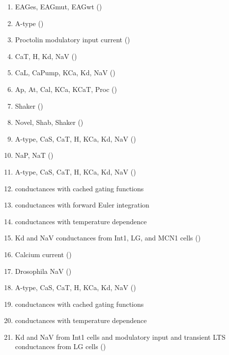 \documentclass[utf8]{frontiers_suppmat} %
\begin{document}
	\begin{enumerate}
		\item EAGes, EAGmut, EAGwt (\cite{bronkRegulationEagCa22018})
		\item A-type (\cite{brookingsAutomaticParameterEstimation2014})
		\item Proctolin modulatory input current (\cite{caplanManyParameterSets2014})
		\item CaT, H, Kd, NaV (\cite{dethierPositiveFeedbackCellular2015})
		\item CaL, CaPump, KCa, Kd, NaV (\cite{drionDopaminePacemakerNeuron2017})
		\item Ap, At, Cal, KCa, KCaT, Proc (\cite{goldmanGlobalStructureRobustness2001})
		\item Shaker (\cite{hardieNovelPotassiumChannels1991})
		\item Novel, Shab, Shaker (\cite{herasModulationVoltagedependentConductances2018})
		\item A-type, CaS, CaT, H, KCa, Kd, NaV (\cite{kisperskyIncreaseSodiumConductance2012})
		\item NaP, NaT (\cite{linActivityDependentAlternativeSplicing2012})
		\item A-type, CaS, CaT, H, KCa, Kd, NaV (\cite{liuModelNeuronActivityDependent1998})
		\item \cite{liuModelNeuronActivityDependent1998} conductances with cached gating functions
		\item \cite{liuModelNeuronActivityDependent1998} conductances with forward Euler integration
		\item \cite{liuModelNeuronActivityDependent1998} conductances with temperature dependence
		\item Kd and NaV conductances from Int1, LG, and MCN1 cells (\cite{nadimFrequencyRegulationSlow1998})
		\item Calcium current (\cite{nadimSynapticDepressionCreates1999})
		\item Drosophila NaV (\cite{odowdVoltageclampAnalysisSodium1988})
		\item A-type, CaS, CaT, H, KCa, Kd, NaV (\cite{prinzAlternativeHandtuningConductancebased2003})
		\item \cite{prinzAlternativeHandtuningConductancebased2003} conductances with cached gating functions
		\item \cite{prinzAlternativeHandtuningConductancebased2003} conductances with temperature dependence
		\item Kd and NaV from Int1 cells and modulatory input and transient LTS conductances from LG cells (\cite{rodriguezConvergentRhythmGeneration2013})

\end{enumerate}
\end{document}
